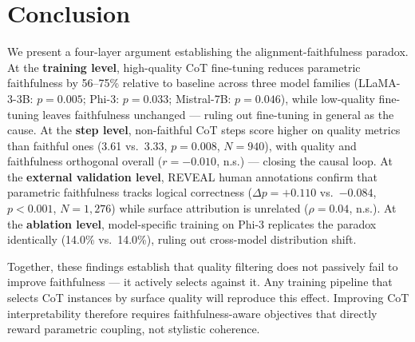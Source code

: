 \documentclass[11pt]{article}
\begin{document}

\section{Conclusion}
\label{sec:conclusion}

We present a four-layer argument establishing the alignment-faithfulness
paradox. At the \textbf{training level}, high-quality CoT fine-tuning reduces
parametric faithfulness by 56--75\% relative to baseline across three model families
(LLaMA-3-3B: $p = 0.005$; Phi-3: $p = 0.033$; Mistral-7B: $p = 0.046$),
while low-quality fine-tuning leaves faithfulness unchanged --- ruling out
fine-tuning in general as the cause.
At the \textbf{step level}, non-faithful CoT steps score higher on quality
metrics than faithful ones (3.61 vs.\ 3.33, $p = 0.008$, $N = 940$), with
quality and faithfulness orthogonal overall ($r = -0.010$, n.s.) --- closing
the causal loop. At the \textbf{external validation level}, REVEAL human
annotations confirm that parametric faithfulness tracks logical correctness
($\Delta p{=}{+}0.110$ vs.\ $-0.084$, $p < 0.001$, $N = 1{,}276$) while
surface attribution is unrelated ($\rho = 0.04$, n.s.). At the
\textbf{ablation level}, model-specific training on Phi-3 replicates the
paradox identically (14.0\% vs.\ 14.0\%), ruling out cross-model distribution
shift.

Together, these findings establish that quality filtering does not passively
fail to improve faithfulness --- it actively selects against it. Any training
pipeline that selects CoT instances by surface quality will reproduce this
effect. Improving CoT interpretability therefore requires faithfulness-aware
objectives that directly reward parametric coupling, not stylistic coherence.


\end{document}
